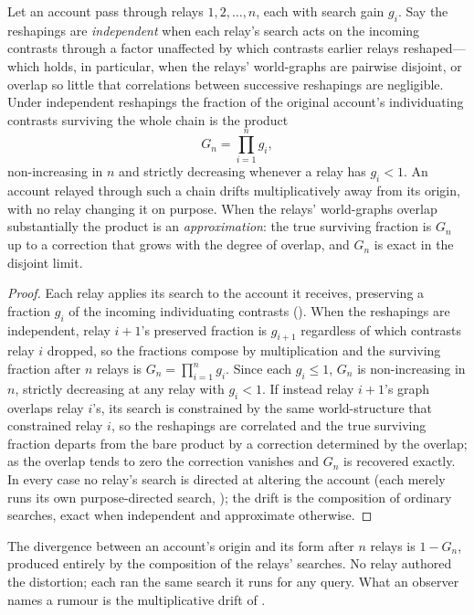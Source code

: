 \documentclass[11pt,twocolumn,a4paper]{article}
\begin{document}
\begin{theorem}
\label{thm:drift}
Let an account pass through relays $1,2,\dots,n$, each with search gain
$g_i$. Say the reshapings are \emph{independent} when each relay's search
acts on the incoming contrasts through a factor unaffected by which
contrasts earlier relays reshaped---which holds, in particular, when the
relays' world-graphs are pairwise disjoint, or overlap so little that
correlations between successive reshapings are negligible. Under independent
reshapings the fraction of the original account's individuating contrasts
surviving the whole chain is the product
\[
G_n=\prod_{i=1}^{n}g_i,
\]
non-increasing in $n$ and strictly decreasing whenever a relay has $g_i<1$.
An account relayed through such a chain drifts multiplicatively away from its
origin, with no relay changing it on purpose. When the relays' world-graphs
overlap substantially the product is an \emph{approximation}: the true
surviving fraction is $G_n$ up to a correction that grows with the degree of
overlap, and $G_n$ is exact in the disjoint limit.
\end{theorem}

\begin{proof}
Each relay applies its search to the account it receives, preserving a
fraction $g_i$ of the incoming individuating contrasts ().
When the reshapings are independent, relay $i{+}1$'s preserved fraction is
$g_{i+1}$ regardless of which contrasts relay $i$ dropped, so the fractions
compose by multiplication and the surviving fraction after $n$ relays is
$G_n=\prod_{i=1}^n g_i$. Since each $g_i\le1$, $G_n$ is non-increasing in
$n$, strictly decreasing at any relay with $g_i<1$. If instead relay
$i{+}1$'s graph overlaps relay $i$'s, its search is constrained by the same
world-structure that constrained relay $i$, so the reshapings are
correlated and the true surviving fraction departs from the bare product by
a correction determined by the overlap; as the overlap tends to zero the
correction vanishes and $G_n$ is recovered exactly. In every case no relay's
search is directed at altering the account (each merely runs its own
purpose-directed search, ); the drift is the composition
of ordinary searches, exact when independent and approximate otherwise.
\end{proof}

\begin{corollary}
\label{cor:rumour}
The divergence between an account's origin and its form after $n$ relays is
$1-G_n$, produced entirely by the composition of the relays' searches. No
relay authored the distortion; each ran the same search it runs for any
query. What an observer names a rumour is the multiplicative drift of
.
\end{corollary}
\end{document}
